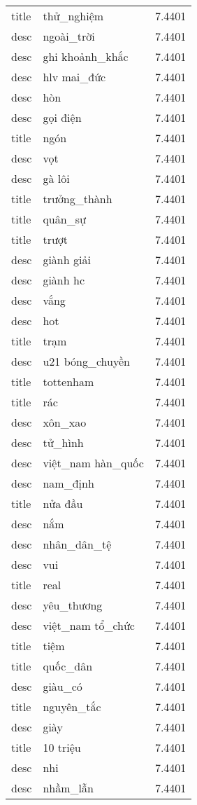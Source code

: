 \documentclass{article}
\begin{document}
\begin{tabular}{lll}
title & thử\_nghiệm & 7.4401\\
desc & ngoài\_trời & 7.4401\\
desc & ghi khoảnh\_khắc & 7.4401\\
desc & hlv mai\_đức & 7.4401\\
desc & hòn & 7.4401\\
desc & gọi điện & 7.4401\\
title & ngón & 7.4401\\
desc & vọt & 7.4401\\
desc & gà lôi & 7.4401\\
title & trưởng\_thành & 7.4401\\
title & quân\_sự & 7.4401\\
title & trượt & 7.4401\\
desc & giành giải & 7.4401\\
desc & giành hc & 7.4401\\
desc & vắng & 7.4401\\
desc & hot & 7.4401\\
title & trạm & 7.4401\\
desc & u21 bóng\_chuyền & 7.4401\\
title & tottenham & 7.4401\\
title & rác & 7.4401\\
desc & xôn\_xao & 7.4401\\
desc & tử\_hình & 7.4401\\
desc & việt\_nam hàn\_quốc & 7.4401\\
desc & nam\_định & 7.4401\\
title & nửa đầu & 7.4401\\
desc & nắm & 7.4401\\
desc & nhân\_dân\_tệ & 7.4401\\
desc & vui & 7.4401\\
title & real & 7.4401\\
desc & yêu\_thương & 7.4401\\
desc & việt\_nam tổ\_chức & 7.4401\\
title & tiệm & 7.4401\\
title & quốc\_dân & 7.4401\\
desc & giàu\_có & 7.4401\\
title & nguyên\_tắc & 7.4401\\
desc & giày & 7.4401\\
title & 10 triệu & 7.4401\\
desc & nhi & 7.4401\\
desc & nhầm\_lẫn & 7.4401\\

\end{tabular}
\end{document}

